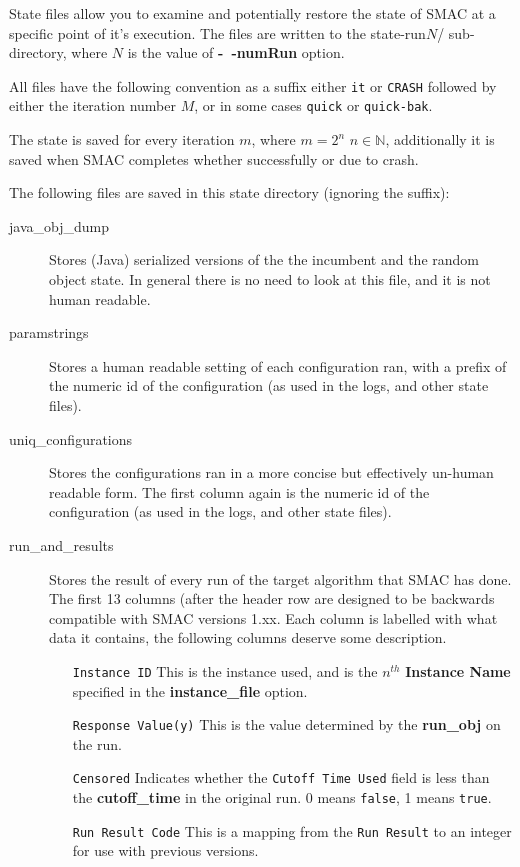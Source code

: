 \documentclass[manual.tex]{subfiles}
\begin{document}
State files allow you to examine and potentially restore the state of SMAC at a specific point of it's execution. The files are written to the state-run$N$/ sub-directory, where $N$ is the value of \textbf{-~$\!$-numRun} option. 


All files have the following convention as a suffix either \texttt{it} or \texttt{CRASH} followed by either the iteration number $M$, or in some cases \texttt{quick} or \texttt{quick-bak}.

The state is saved for every iteration $m$, where $m=2^{n}$ $n \in \mathbb{N}$, additionally it is saved when SMAC completes whether successfully or due to crash.

The following files are saved in this state directory (ignoring the suffix):

\begin{description}
\item[java\_obj\_dump] Stores (Java) serialized versions of the the incumbent and the random object state. In general there is no need to look at this file, and it is not human readable.

\item[paramstrings]	  Stores a human readable setting of each configuration ran, with a prefix of the numeric id of the configuration (as used in the logs, and other state files).

\item[uniq\_configurations] Stores the configurations ran in a more concise but effectively un-human readable form. The first column again is the numeric id of the configuration (as used in the logs, and other state files).

\item[run\_and\_results] Stores the result of every run of the target algorithm that SMAC has done. The first 13 columns (after the header row are designed to be backwards compatible with SMAC versions 1.xx. Each column is labelled with what data it contains, the following columns deserve some description.
	\begin{enumerate}
	\item[\texttt{Instance ID}]	This is the instance used, and is the $n^{th}$ \textbf{Instance Name} specified in the \textbf{instance\_file} option.
	\item[\texttt{Response Value(y)}]  This is the value determined by the \textbf{run\_obj} on the run.
	\item[\texttt{Censored}] Indicates whether the \texttt{Cutoff Time Used} field is less than the \textbf{cutoff\_time} in the original run. 0 means \texttt{false}, 1 means \texttt{true}.
	\item[\texttt{Run Result Code}]	This is a mapping from the \texttt{Run Result} to an integer for use with previous versions.
	\end{enumerate}
\end{description}
\end{document}
